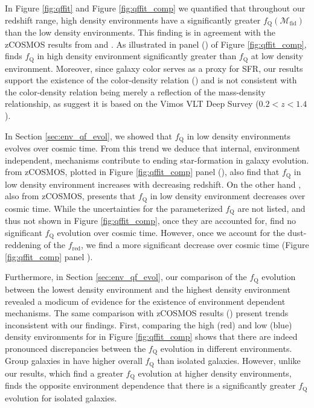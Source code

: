 \documentclass{emulateapj}
\begin{document}
In Figure \ref{fig:qffit} and Figure \ref{fig:qffit_comp} we
quantified that throughout our redshift range, high density
environments have a significantly greater
$f_{\mathrm{Q}}(\mathcal{M}_{\mathrm{fid}})$ than the low density
environments. This finding is in agreement with the zCOSMOS results
from \cite{Cucciati:2010aa} and \cite{Kovac:2014aa}. As illustrated in
panel (\kovacpanel) of Figure \ref{fig:qffit_comp}, \cite{Kovac:2014aa} finds $f_{\mathrm{Q}}$ in high density environment
significantly greater than $f_{\mathrm{Q}}$ at low density
environment. Moreover, since galaxy color serves as a proxy for SFR,
our results support the existence of the color-density relation
(\citealt{Cucciati:2010aa, Cooper:2010aa}) and is not consistent with
the color-density relation being merely a reflection of the
mass-density relationship, as \cite{Scodeggio:2009aa} suggest it is
based on the Vimos VLT Deep Survey ($0.2 < z< 1.4$).


In Section \ref{sec:env_qf_evol}, we showed that $f_{\mathrm{Q}}$ in
low density environments evolves over cosmic time. From this trend we
deduce that internal, environment independent, mechanisms contribute
to ending star-formation in galaxy evolution. \cite{Iovino:2010aa}
from zCOSMOS, plotted in Figure \ref{fig:qffit_comp}  panel (\iovinopanel), also find that
$f_{\mathrm{Q}}$ in low density environment increases with decreasing redshift. On the other hand \cite{Kovac:2014aa}, also from zCOSMOS, presents that $f_{\mathrm{Q}}$ in low density environment decreases over cosmic time. While the uncertainties for the parameterized $f_{\mathrm{Q}}$ are not listed, and thus not shown in Figure \ref{fig:qffit_comp}, once they are accounted for, \cite{Kovac:2014aa} find no significant $f_{\mathrm{Q}}$ evolution over cosmic time. However, once we account for the dust-reddening of the $f_{\mathrm{red}}$, we find a more significant decrease over cosmic time (Figure \ref{fig:qffit_comp} panel \kovacpanel).

Furthermore, in Section \ref{sec:env_qf_evol}, our comparison of the
$f_{\mathrm{Q}}$ evolution between the lowest density environment and the
highest density environment revealed a modicum of evidence for the
existence of environment dependent mechanisms. The same comparison
with zCOSMOS results (\citealt{Iovino:2010aa, Kovac:2014aa}) present
trends inconsistent with our findings. First, comparing the high (red)
and low (blue) density environments for \cite{Iovino:2010aa} in Figure
\ref{fig:qffit_comp} shows that there are indeed pronounced
discrepancies between the $f_{\mathrm{Q}}$ evolution in different
environments. Group galaxies in \cite{Iovino:2010aa} have higher
overall $f_{\mathrm{Q}}$ than isolated galaxies. However, unlike our
results, which find a greater $f_{\mathrm{Q}}$ evolution at higher density
environments, \cite{Iovino:2010aa} finds the opposite environment
dependence that there is a significantly greater $f_{\mathrm{Q}}$
evolution for isolated galaxies.
\end{document}
